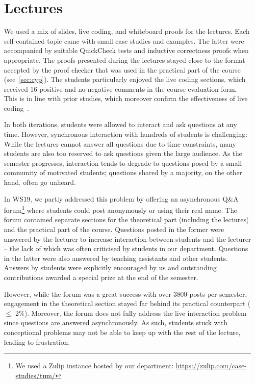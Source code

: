 \section{Lectures}\label{sec:lectures}

We used a mix of
slides,
live coding, and whiteboard proofs for the lectures.
Each self-contained topic came with small case studies and examples.
The latter were accompanied by suitable QuickCheck tests
and inductive correctness proofs when appropriate.
The proofs presented during the lectures stayed close to the format accepted by the proof checker that was used in the practical part of the course (see~\cref{sec:cyp}).
The students particularly enjoyed the live coding sections,
which received 16 positive and no negative comments in the course evaluation form.
This is in line with prior studies,
which moreover confirm the effectiveness of live coding~\cite{livecoding1,livecoding2}.

In both iterations, students were allowed to interact and ask questions at any time.
However, synchronous interaction with hundreds of students is challenging:
While the lecturer cannot answer all questions due to time constraints,
many students are also too reserved to ask questions given the large audience.
As the semester progresses, interaction tends to degrade to
questions posed by a small community of motivated students;
questions shared by a majority, on the other hand, often go unheard.

In WS19, we partly addressed this problem by offering an asynchronous Q\&A forum\footnote{We used a Zulip instance hosted by our department: \url{https://zulip.com/case-studies/tum/}}
where students could post anonymously or using their real name.
The forum contained separate sections for the theoretical part (including the lectures)
and the practical part of the course.
Questions posted in the former were answered by the lecturer
to increase interaction between students and the lecturer -- the lack of which was often criticised by students in our department.
Questions in the latter were also answered by teaching assistants and other students.
Answers by students were explicitly encouraged by us and
outstanding contributions awarded a special prize at the end of the semester.

However, while the forum was a great success with over 3800 posts per semester,
engagement in the theoretical section stayed far behind its practical counterpart ($\leq$ 2\%).
Moreover, the forum does not fully address the live interaction problem since
questions are answered asynchronously.
As such, students stuck with conceptional problems may not be able
to keep up with the rest of the lecture,
leading to frustration.

